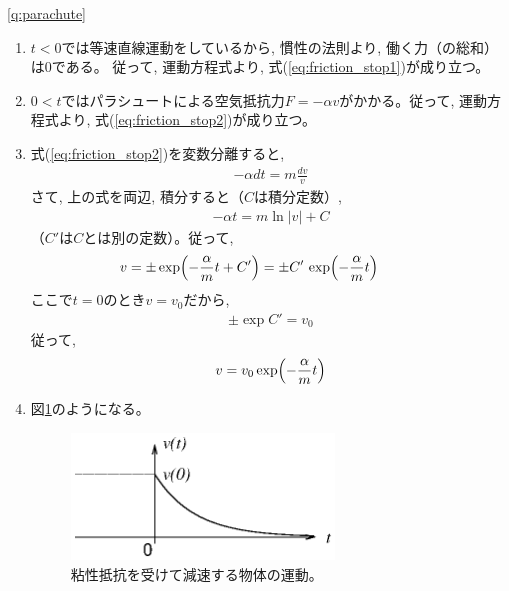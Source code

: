 \ref{q:parachute}
\begin{enumerate}
\item $t<0$では等速直線運動をしているから, 慣性の法則より, 働く力（の総和）は0である。
従って, 運動方程式より, 式(\ref{eq:friction_stop1})が成り立つ。
\item $0<t$ではパラシュートによる空気抵抗力$F=-\alpha v$がかかる。従って, 運動方程式より, 式(\ref{eq:friction_stop2})が成り立つ。
\item 式(\ref{eq:friction_stop2})を変数分離すると, 
\begin{eqnarray}-\alpha dt=m\frac{dv}{v}\end{eqnarray}
さて, 上の式を両辺, 積分すると（$C$は積分定数）, 
\begin{eqnarray}-\alpha t=m\ln|v|+C\end{eqnarray}
（$C'$は$C$とは別の定数）。従って, 
\begin{eqnarray}v=\pm \exp\Bigl(-\frac{\alpha}{m}t+C'\Bigr)=\pm C'\,\exp\Bigl(-\frac{\alpha}{m}t\Bigr)\quad\quad\quad\end{eqnarray}
ここで$t=0$のとき$v=v_0$だから, 
\begin{eqnarray}\pm \exp C'=v_0\end{eqnarray}
従って, 
\begin{eqnarray}v=v_0 \exp\Bigl(-\frac{\alpha}{m}t\Bigr)\end{eqnarray}
\item 図\ref{fig:viscos}のようになる。
\begin{figure}[h]
    \centering
    \includegraphics[width=7cm]{viscos.eps}
    \caption{粘性抵抗を受けて減速する物体の運動。}\label{fig:viscos}
\end{figure}
\end{enumerate}
\vspace{0.2cm}


